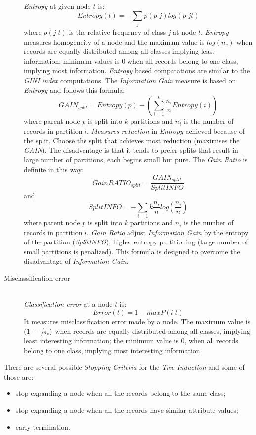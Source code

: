 \begin{description}
	\emph{Entropy} at given node $t$ is:
	$$
		Entropy(t) = - \sum_{j} p\left(p|j\right)log\left(p|jt\right)
	$$
	where $p\left(j|t\right)$ is the relative frequency of class $j$ at node $t$.
	\emph{Entropy} measures homogeneity of a node and the maximum value is $log\left(n_c\right)$ when records are equally distributed among all classes implying least information; minimum values is $0$ when all records belong to one class, implying most information.
	\emph{Entropy} based computations are similar to the \emph{GINI index} computations.
	The \emph{Information Gain} measure is based on \emph{Entropy} and follows this formula:
	$$
		GAIN_{split} = Entropy(p) - \left(\sum_{i = 1}^{k} \frac{n_i}{n} Entropy(i)\right)
	$$
	where parent node $p$ is split into $k$ partitions and $n_i$ is the number of records in partition $i$.
	\emph{Measures reduction} in \emph{Entropy} achieved because of the split.
	Choose the split that achieves most reduction (maximises the \emph{GAIN}).
	The disadvantage is that it tends to prefer splits that result in large number of partitions, each begins small but pure.
	The \emph{Gain Ratio} is definite in this way:
	$$
		GainRATIO_{split} = \frac{GAIN_{split}}{SplitINFO}
	$$
	and
	$$
		SplitINFO = -\sum_{i = 1}{k} \frac{n_i}{n}log\left(\frac{n_i}{n}\right)
	$$
	where parent node $p$ is split into $k$ partitions and $n_i$ is the number of records in partition $i$.
	\emph{Gain Ratio} adjust \emph{Information Gain} by the entropy of the partition (\emph{SplitINFO}); higher entropy partitioning (large number of small partitions is penalized).
	This formula is designed to overcome the disadvantage of \emph{Information Gain}.
	\item[Misclassification error]\mbox{}\\
	\emph{Classification error} at a node $t$ is:
	$$
		Error(t) = 1 - maxP\left(i|t\right)
	$$
	It measures misclassification error made by a node.
	The maximum value is $\left(1 - \sfrac{1}{n_c}\right)$ when records are equally distributed among all classes, implying least interesting information; the minimum value is $0$, when all records belong to one class, implying most interesting information.
\end{description}
There are several possible \emph{Stopping Criteria} for the \emph{Tree Induction} and some of those are:
\begin{itemize}
	\item
	stop expanding a node when all the records belong to the same class;
	\item
	stop expanding a node when all the records have similar attribute values;
	\item
	early termination.
\end{itemize}

